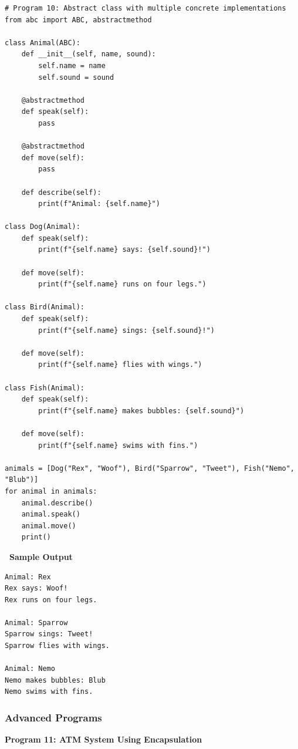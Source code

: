 \documentclass[12pt,a4paper]{article}
\newcommand{\outhead}{\noindent\colorbox{cmrgreen!25}%
  {\textbf{\small\color{cmrdark}~Sample Output~}}\par\vspace{-1pt}}
\begin{document}
\begin{lstlisting}
# Program 10: Abstract class with multiple concrete implementations
from abc import ABC, abstractmethod

class Animal(ABC):
    def __init__(self, name, sound):
        self.name = name
        self.sound = sound

    @abstractmethod
    def speak(self):
        pass

    @abstractmethod
    def move(self):
        pass

    def describe(self):
        print(f"Animal: {self.name}")

class Dog(Animal):
    def speak(self):
        print(f"{self.name} says: {self.sound}!")

    def move(self):
        print(f"{self.name} runs on four legs.")

class Bird(Animal):
    def speak(self):
        print(f"{self.name} sings: {self.sound}!")

    def move(self):
        print(f"{self.name} flies with wings.")

class Fish(Animal):
    def speak(self):
        print(f"{self.name} makes bubbles: {self.sound}")

    def move(self):
        print(f"{self.name} swims with fins.")

animals = [Dog("Rex", "Woof"), Bird("Sparrow", "Tweet"), Fish("Nemo", "Blub")]
for animal in animals:
    animal.describe()
    animal.speak()
    animal.move()
    print()
\end{lstlisting}

\outhead
\begin{lstlisting}[style=outputstyle]
Animal: Rex
Rex says: Woof!
Rex runs on four legs.

Animal: Sparrow
Sparrow sings: Tweet!
Sparrow flies with wings.

Animal: Nemo
Nemo makes bubbles: Blub
Nemo swims with fins.
\end{lstlisting}

\subsubsection{Advanced Programs}

\textbf{Program 11: ATM System Using Encapsulation}
\end{document}
